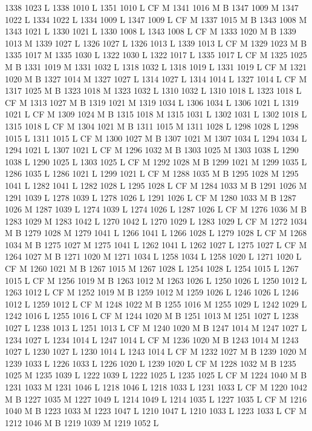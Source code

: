 {{{{{{{{{{{{{{{{{{{{{{{{{{{1338 1023 L
1338 1010 L
1351 1010 L
CF M
1341 1016 M B
1347 1009 M 1347 1022 L
1334 1022 L
1334 1009 L
1347 1009 L
CF M
1337 1015 M B
1343 1008 M 1343 1021 L
1330 1021 L
1330 1008 L
1343 1008 L
CF M
1333 1020 M B
1339 1013 M 1339 1027 L
1326 1027 L
1326 1013 L
1339 1013 L
CF M
1329 1023 M B
1335 1017 M 1335 1030 L
1322 1030 L
1322 1017 L
1335 1017 L
CF M
1325 1025 M B
1331 1019 M 1331 1032 L
1318 1032 L
1318 1019 L
1331 1019 L
CF M
1321 1020 M B
1327 1014 M 1327 1027 L
1314 1027 L
1314 1014 L
1327 1014 L
CF M
1317 1025 M B
1323 1018 M 1323 1032 L
1310 1032 L
1310 1018 L
1323 1018 L
CF M
1313 1027 M B
1319 1021 M 1319 1034 L
1306 1034 L
1306 1021 L
1319 1021 L
CF M
1309 1024 M B
1315 1018 M 1315 1031 L
1302 1031 L
1302 1018 L
1315 1018 L
CF M
1304 1021 M B
1311 1015 M 1311 1028 L
1298 1028 L
1298 1015 L
1311 1015 L
CF M
1300 1027 M B
1307 1021 M 1307 1034 L
1294 1034 L
1294 1021 L
1307 1021 L
CF M
1296 1032 M B
1303 1025 M 1303 1038 L
1290 1038 L
1290 1025 L
1303 1025 L
CF M
1292 1028 M B
1299 1021 M 1299 1035 L
1286 1035 L
1286 1021 L
1299 1021 L
CF M
1288 1035 M B
1295 1028 M 1295 1041 L
1282 1041 L
1282 1028 L
1295 1028 L
CF M
1284 1033 M B
1291 1026 M 1291 1039 L
1278 1039 L
1278 1026 L
1291 1026 L
CF M
1280 1033 M B
1287 1026 M 1287 1039 L
1274 1039 L
1274 1026 L
1287 1026 L
CF M
1276 1036 M B
1283 1029 M 1283 1042 L
1270 1042 L
1270 1029 L
1283 1029 L
CF M
1272 1034 M B
1279 1028 M 1279 1041 L
1266 1041 L
1266 1028 L
1279 1028 L
CF M
1268 1034 M B
1275 1027 M 1275 1041 L
1262 1041 L
1262 1027 L
1275 1027 L
CF M
1264 1027 M B
1271 1020 M 1271 1034 L
1258 1034 L
1258 1020 L
1271 1020 L
CF M
1260 1021 M B
1267 1015 M 1267 1028 L
1254 1028 L
1254 1015 L
1267 1015 L
CF M
1256 1019 M B
1263 1012 M 1263 1026 L
1250 1026 L
1250 1012 L
1263 1012 L
CF M
1252 1019 M B
1259 1012 M 1259 1026 L
1246 1026 L
1246 1012 L
1259 1012 L
CF M
1248 1022 M B
1255 1016 M 1255 1029 L
1242 1029 L
1242 1016 L
1255 1016 L
CF M
1244 1020 M B
1251 1013 M 1251 1027 L
1238 1027 L
1238 1013 L
1251 1013 L
CF M
1240 1020 M B
1247 1014 M 1247 1027 L
1234 1027 L
1234 1014 L
1247 1014 L
CF M
1236 1020 M B
1243 1014 M 1243 1027 L
1230 1027 L
1230 1014 L
1243 1014 L
CF M
1232 1027 M B
1239 1020 M 1239 1033 L
1226 1033 L
1226 1020 L
1239 1020 L
CF M
1228 1032 M B
1235 1025 M 1235 1039 L
1222 1039 L
1222 1025 L
1235 1025 L
CF M
1224 1040 M B
1231 1033 M 1231 1046 L
1218 1046 L
1218 1033 L
1231 1033 L
CF M
1220 1042 M B
1227 1035 M 1227 1049 L
1214 1049 L
1214 1035 L
1227 1035 L
CF M
1216 1040 M B
1223 1033 M 1223 1047 L
1210 1047 L
1210 1033 L
1223 1033 L
CF M
1212 1046 M B
1219 1039 M 1219 1052 L
}}}}}}}}}}}}}}}}}}}}}}}}}}}
